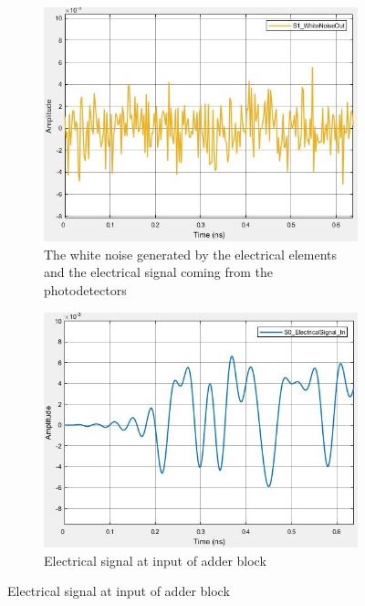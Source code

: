 \begin{figure}[H]%
	\begin{subfigure}{.4\textwidth}
		\centering
		\includegraphics[scale=0.4]{./lib/ti_amplifier/figures/white_noise_in.png}
		\caption{The white noise generated by the electrical elements and the electrical signal coming from the photodetectors}
		\label{fig:White Noise}
	\end{subfigure}
	\begin{subfigure}{0.4\textwidth}
		\centering
		\includegraphics[scale=0.42]{./lib/ti_amplifier/figures/Electrical_signal_in.png}
		\caption{Electrical signal at input of adder block}
		\label{fig:Adder In}
	\end{subfigure}
\end{figure}
